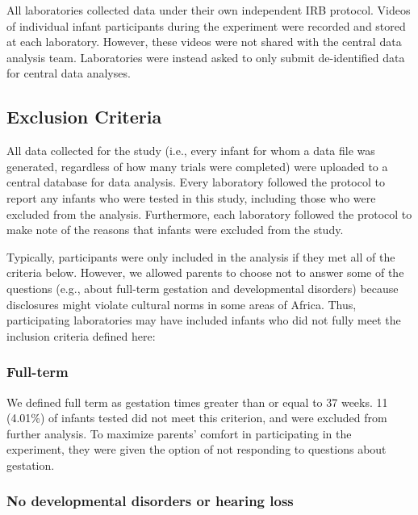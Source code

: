 \documentclass[
  ,man,floatsintext]{apa6}
\begin{document}
All laboratories collected data under their own independent IRB protocol. Videos of individual infant participants during the experiment were recorded and stored at each laboratory. However, these videos were not shared with the central data analysis team. Laboratories were instead asked to only submit de-identified data for central data analyses.

\hypertarget{exclusion-criteria}{%
\subsection{Exclusion Criteria}\label{exclusion-criteria}}

All data collected for the study (i.e., every infant for whom a data file was generated, regardless of how many trials were completed) were uploaded to a central database for data analysis. Every laboratory followed the protocol to report any infants who were tested in this study, including those who were excluded from the analysis. Furthermore, each laboratory followed the protocol to make note of the reasons that infants were excluded from the study.

Typically, participants were only included in the analysis if they met all of the criteria below. However, we allowed parents to choose not to answer some of the questions (e.g., about full-term gestation and developmental disorders) because disclosures might violate cultural norms in some areas of Africa. Thus, participating laboratories may have included infants who did not fully meet the inclusion criteria defined here:

\hypertarget{full-term}{%
\subsubsection{Full-term}\label{full-term}}

We defined full term as gestation times greater than or equal to 37 weeks. 11 (4.01\%) of infants tested did not meet this criterion, and were excluded from further analysis. To maximize parents' comfort in participating in the experiment, they were given the option of not responding to questions about gestation.

\hypertarget{no-developmental-disorders-or-hearing-loss}{%
\subsubsection{No developmental disorders or hearing loss}\label{no-developmental-disorders-or-hearing-loss}}
\end{document}

